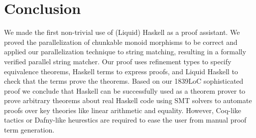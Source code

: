 \section{Conclusion}\label{sec:conclusion}
We made the first non-trivial use of (Liquid) Haskell as a proof
assistant. 
We proved the parallelization of chunkable monoid
morphisms to be correct
and applied our parallelization technique to string matching,
resulting in a formally verified parallel string matcher.
%
Our proof uses refinement types to specify
equivalence theorems,
Haskell terms to express proofs,
and Liquid Haskell to check that the terms prove the theorems.
%
Based on our 1839LoC sophisticated proof we conclude that
Haskell can be successfully used as a theorem prover
to prove arbitrary theorems about real Haskell code
using SMT solvers to automate proofs
over key theories like linear arithmetic and equality.
%
However, Coq-like tactics or Dafny-like heurestics are required
to ease the user from manual proof term generation.


\begin{comment}
  - lines of code
  - interaction of proofs with code
        no interaction: the main proof
        invariant good indices are requied to prove that
           if target it bigger than input then indices is empty
           proof oof good indexing requires casting
   - proof reuse
   - trust library factions with assume annotations
\end{comment}
